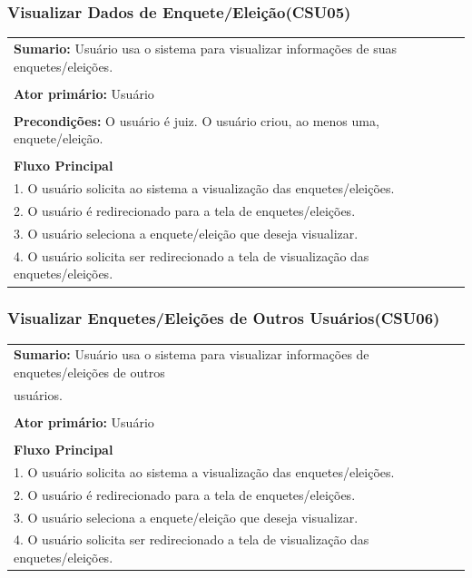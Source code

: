 \documentclass[a4paper,12pt]{report}
\begin{document}
\begin{center}
	{\subsubsection*{Visualizar Dados de Enquete/Eleição(CSU05)}}
\end{center}
\markright{}
\begin{tabularx}{\textwidth}{|X|}\hline
	{\textbf{Sumario:}} Usuário usa o sistema para visualizar informações de suas enquetes/eleições.\ \ \ \ \ \ \ \ \ \\\\
	{\textbf{Ator primário:}} Usuário \\\\
	{\textbf{Precondições:}} O usuário é juiz. O usuário criou, ao menos uma, enquete/eleição.\\\\
	{\textbf{Fluxo Principal}}\\
	1. O usuário solicita ao sistema a visualização das enquetes/eleições.\\
	2. O usuário é redirecionado para a tela de enquetes/eleições. \\
	3. O usuário seleciona a enquete/eleição que deseja visualizar. \\
	4. O usuário solicita ser redirecionado a tela de visualização das enquetes/eleições.\\
	\hline
\end{tabularx}

\begin{center}
	{\subsubsection*{Visualizar Enquetes/Eleições de Outros Usuários(CSU06)}}
\end{center}
\markright{}
\begin{tabularx}{\textwidth}{|X|}\hline
	{\textbf{Sumario:}} Usuário usa o sistema para visualizar informações de enquetes/eleições de outros \hfill \\ usuários. \\\\
	{\textbf{Ator primário:}} Usuário \\\\
	{\textbf{Fluxo Principal}}\\
	1. O usuário solicita ao sistema a visualização das enquetes/eleições.\\
	2. O usuário é redirecionado para a tela de enquetes/eleições. \\
	3. O usuário seleciona a enquete/eleição que deseja visualizar. \\
	4. O usuário solicita ser redirecionado a tela de visualização das enquetes/eleições.\\
	\hline
\end{tabularx}
\end{document}
